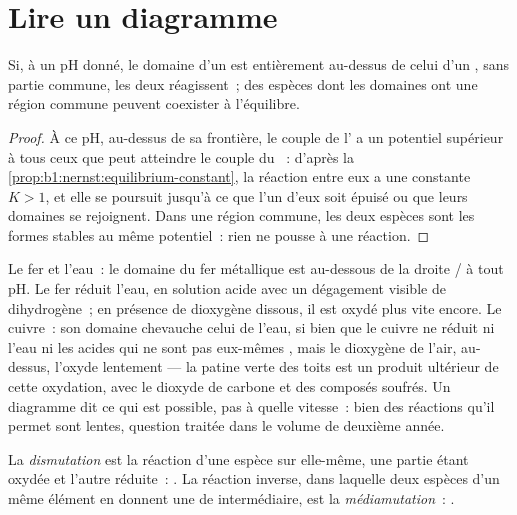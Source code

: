 \section{Lire un diagramme}\label{sec:b1:e-ph-diagrams:reading}

\begin{proposition}\label{prop:b1:e-ph-diagrams:disjoint-domains}
Si, à un pH donné, le domaine d'un  est entièrement au-dessus de
celui d'un , sans partie commune, les deux réagissent~; des
espèces dont les domaines ont une région commune peuvent coexister à
l'équilibre.
\end{proposition}

\begin{proof}
À ce pH, au-dessus de sa frontière, le couple de l' a un potentiel
supérieur à tous ceux que peut atteindre le couple du ~:
d'après la \cref{prop:b1:nernst:equilibrium-constant}, la réaction entre
eux a une constante
$K > 1$, et elle se poursuit jusqu'à ce que l'un d'eux soit épuisé ou que
leurs domaines se rejoignent. Dans une région commune, les deux espèces
sont les formes stables au même potentiel~: rien ne pousse à une
réaction.
\end{proof}

Le fer et l'eau~: le domaine du fer métallique est au-dessous de la
droite / à tout pH. Le fer réduit l'eau, en solution
acide avec un dégagement visible de dihydrogène~; en présence de
dioxygène dissous, il est oxydé plus vite encore. Le cuivre~: son domaine
chevauche celui de l'eau, si bien que le cuivre ne réduit ni l'eau ni
les acides qui ne sont pas eux-mêmes , mais le dioxygène de
l'air, au-dessus, l'oxyde lentement --- la patine verte des toits est un
produit ultérieur de cette oxydation, avec le dioxyde de carbone et des
composés soufrés. Un diagramme dit ce qui est possible, pas à quelle
vitesse~: bien des réactions qu'il permet sont lentes, question traitée
dans le volume de deuxième année.

\begin{definition}\label{def:b1:e-ph-diagrams:disproportionation}
La \emph{dismutation} est la réaction d'une espèce
sur elle-même, une partie étant oxydée et l'autre réduite~:
. La réaction inverse, dans laquelle deux espèces
d'un même élément en donnent une de  intermédiaire, est
la \emph{médiamutation}~:
.
\end{definition}

